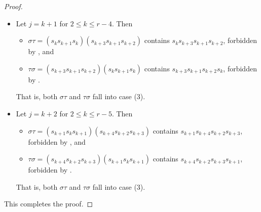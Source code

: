 \documentclass{amsart}
\theoremstyle{definition}
\begin{document}
\begin{appendices}
\begin{proof}
\begin{itemize}
\begin{itemize}
            \item $\tau\sigma=(s_{k+2}s_{k}s_{k+1})(s_ks_{k+1}s_k)=(s_{k+2}s_ks_{k+1})(s_{k+1}s_ks_{k+1}) = s_{k+2}s_{k+1}\in S$.
        \end{itemize}
        That is, $\sigma\tau$ falls into case (3) and $\tau\sigma$ falls into case (1).
        \item Let $j=k+1$ for $2\leq k\leq r-4$. Then \begin{itemize}
            \item $\sigma\tau=(s_ks_{k+1}s_k)(s_{k+3}s_{k+1}s_{k+2})$ contains $s_ks_{k+3}s_{k+1}s_{k+2}$, forbidden by , and
            \item $\tau\sigma=(s_{k+3}s_{k+1}s_{k+2})(s_ks_{k+1}s_k)$ contains $s_{k+3}s_{k+1}s_{k+2}s_k$, forbidden by .
        \end{itemize}
        That is, both $\sigma\tau$ and $\tau\sigma$ fall into case (3).
        \item Let $j=k+2$ for $2\leq k\leq r-5$. Then \begin{itemize}
            \item $\sigma\tau=(s_{k+1}s_{k}s_{k+1})(s_{k+4}s_{k+2}s_{k+3})$ contains $s_{k+1}s_{k+4}s_{k+2}s_{k+3}$, forbidden by , and
            \item $\tau\sigma=(s_{k+4}s_{k+2}s_{k+3})(s_{k+1}s_ks_{k+1})$ contains $s_{k+4}s_{k+2}s_{k+3}s_{k+1}$, forbidden by .
        \end{itemize}
        That is, both $\sigma\tau$ and $\tau\sigma$ fall into case (3).
    \end{itemize}
   This completes the proof.
\end{proof}


\end{appendices}



\end{document}
